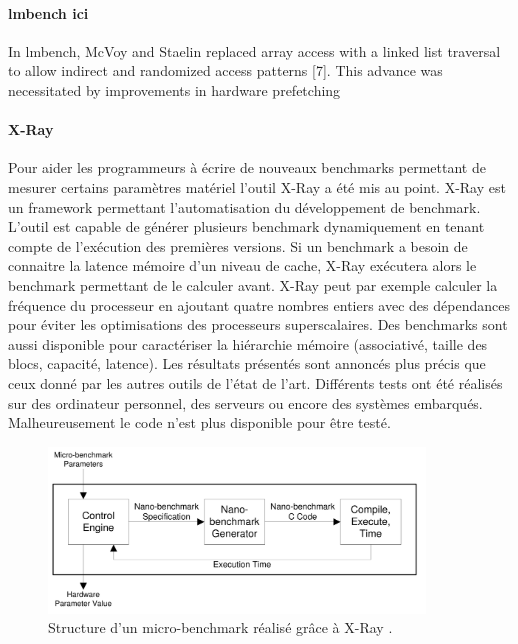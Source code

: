 \paragraph{lmbench ici}
In lmbench, McVoy and Staelin replaced array access with
a linked list traversal to allow indirect and randomized access
patterns [7]. This advance was necessitated by improvements
in hardware prefetching

\paragraph{X-Ray \cite{Yotov2004}} Pour aider les programmeurs à écrire de nouveaux benchmarks permettant de mesurer certains paramètres matériel l'outil X-Ray a été mis au point. X-Ray est un framework permettant l'automatisation du développement de benchmark. L'outil est capable de générer plusieurs benchmark dynamiquement en tenant compte de l'exécution des premières versions. Si un benchmark a besoin de connaitre la latence mémoire d'un niveau de cache, X-Ray exécutera alors le benchmark permettant de le calculer avant. X-Ray peut par exemple calculer la fréquence du processeur en ajoutant quatre nombres entiers avec des dépendances pour éviter les optimisations des processeurs superscalaires. Des benchmarks sont aussi disponible pour caractériser la hiérarchie mémoire (associativé, taille des blocs, capacité, latence). Les résultats présentés sont annoncés plus précis que ceux donné par les autres outils de l'état de l'art. Différents tests ont été réalisés sur des ordinateur personnel, des serveurs ou encore des systèmes embarqués. Malheureusement le code n'est plus disponible pour être testé. 

\begin{figure}
    \center
    \includegraphics[width=10cm]{images/bench_xray.png}
    \caption{ Structure d'un micro-benchmark réalisé grâce à X-Ray  \cite{Yotov2004}.
    \label{pic_bench_xray}}
\end{figure}


